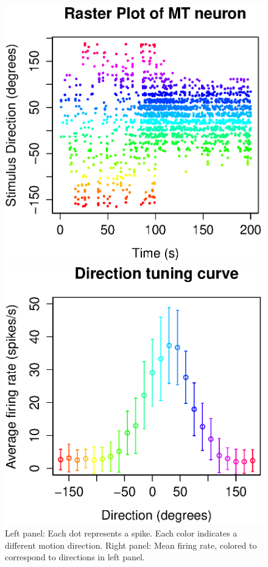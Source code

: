 \documentclass[
letterpaper, %
11pt, %
 oneside, 
onecolumn, %
]{memoir}
\numberwithin{Exercise}{chapter}
\begin{document}
\begin{figure}
\begin{minipage}{0.55\textwidth}
  \centering
\includegraphics[scale=0.6]{raster}
  
\end{minipage}%
\begin{minipage}{0.55\textwidth}
  \centering
\includegraphics[scale=0.6]{colored_dirtune}
\end{minipage}%
\caption{Left panel: Each dot represents a spike. Each color indicates a different motion direction. Right panel: Mean firing rate, colored to correspond to directions in left panel.}
\end{figure}
\end{document}
